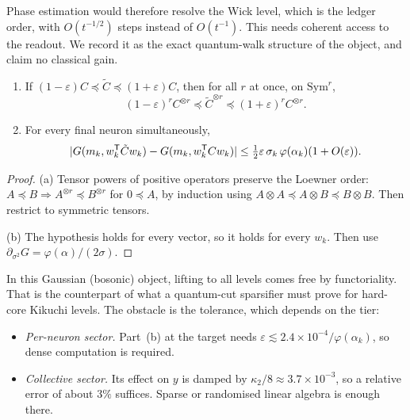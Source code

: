 Phase estimation would therefore resolve the Wick level, which is the ledger order, with
$O(t^{-1/2})$ steps instead of $O(t^{-1})$. This needs coherent access to the readout. We record it as the exact
quantum-walk structure of the object, and claim no classical gain.

\begin{proposition}\label{prop:lift}
\begin{enumerate}[label=(\alph*),leftmargin=1.6em,itemsep=1pt,topsep=1pt]
\item If $(1-\varepsilon)C\preceq\tilde C\preceq(1+\varepsilon)C$, then for all $r$ at once, on $\mathrm{Sym}^r$,
\[
(1-\varepsilon)^rC^{\otimes r}\preceq\tilde C^{\otimes r}\preceq(1+\varepsilon)^rC^{\otimes r}.
\]
\item For every final neuron simultaneously,
\[
|G(m_k,w_k^{\mathsf T}\tilde Cw_k)-G(m_k,w_k^{\mathsf T} Cw_k)|\le\tfrac12\varepsilon\,\sigma_k\,\varphi(\alpha_k)(1+O(\varepsilon)).
\]
\end{enumerate}
\end{proposition}
\begin{proof}
(a) Tensor powers of positive operators preserve the Loewner order:
$A\preceq B\Rightarrow A^{\otimes r}\preceq B^{\otimes r}$ for $0\preceq A$, by induction using $A\otimes A\preceq A\otimes B\preceq B\otimes B$. Then
restrict to symmetric tensors.

(b) The hypothesis holds for every vector, so it holds for every $w_k$. Then use
$\partial_{\sigma^2}G=\varphi(\alpha)/(2\sigma)$.
\end{proof}

In this Gaussian (bosonic) object, lifting to all levels comes free by functoriality. That is the
counterpart of what a quantum-cut sparsifier must prove for hard-core Kikuchi levels. The obstacle is the
tolerance, which depends on the tier:
\begin{itemize}[leftmargin=1.2em,itemsep=0pt,topsep=1pt]
\item \emph{Per-neuron sector.} Part~(b) at the target needs $\varepsilon\lesssim2.4\times10^{-4}/\varphi(\alpha_k)$, so dense
computation is required.
\item \emph{Collective sector.} Its effect on $y$ is damped by $\kappa_2/8\approx3.7\times10^{-3}$, so a relative error
of about $3\%$ suffices. Sparse or randomised linear algebra is enough there.
\end{itemize}

